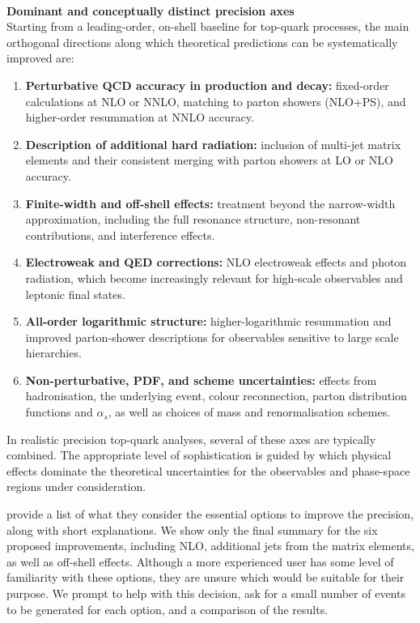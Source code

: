 \documentclass[submission, Phys]{SciPost}
\begin{document}
\begin{promptblock}\\ 
\textbf{Dominant and conceptually distinct precision axes}\\
Starting from a leading-order, on-shell baseline for top-quark processes, the main orthogonal directions along which theoretical predictions can be systematically improved are:
\begin{enumerate}
  \item \textbf{Perturbative QCD accuracy in production and decay:}
  fixed-order calculations at NLO or NNLO, matching to parton showers (NLO+PS), and higher-order resummation at NNLO accuracy.

  \item \textbf{Description of additional hard radiation:}
  inclusion of multi-jet matrix elements and their consistent merging with parton showers at LO or NLO accuracy.

  \item \textbf{Finite-width and off-shell effects:}
  treatment beyond the narrow-width approximation, including the full resonance structure, non-resonant contributions, and interference effects.

  \item \textbf{Electroweak and QED corrections:}
  NLO electroweak effects and photon radiation, which become increasingly relevant for high-scale observables and leptonic final states.

  \item \textbf{All-order logarithmic structure:}
  higher-logarithmic resummation and improved parton-shower descriptions for observables sensitive to large scale hierarchies.

  \item \textbf{Non-perturbative, PDF, and scheme uncertainties:}
  effects from hadronisation, the underlying event, colour reconnection, parton distribution functions and $\alpha_s$, as well as choices of mass and renormalisation schemes.
\end{enumerate}

In realistic precision top-quark analyses, several of these axes are typically combined. The appropriate level of sophistication is guided by which physical effects dominate the theoretical uncertainties for the observables and phase-space regions under consideration.

\end{promptblock} 
%
\ma provide a list of what they consider the essential options to improve the precision, along with short explanations. We show only the final summary for the six proposed improvements, including NLO, additional jets from the matrix elements, as well as off-shell effects. Although a more experienced user has some level of familiarity with these options, they are unsure which would be suitable for their purpose. We prompt \ma to help with this decision, ask for a small number of events to be generated for each option, and a comparison of the results.
\end{document}
